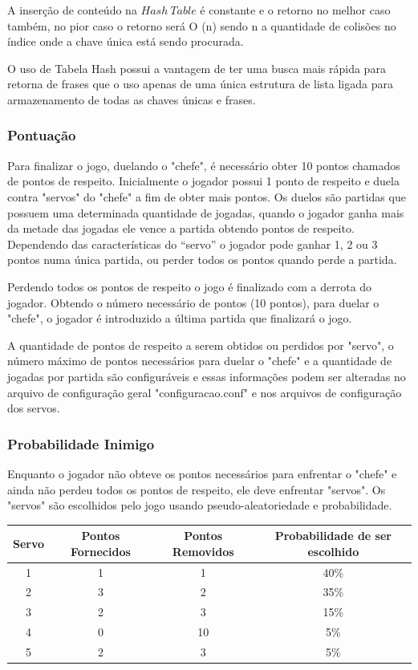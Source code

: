 \documentclass[12pt]{article}
\begin{document}
A inserção de conteúdo na $Hash\ Table$ é constante e o retorno no melhor caso também, no pior caso o retorno será O (n) sendo n a quantidade de colisões no índice onde a chave única está sendo procurada.   
 
O uso de Tabela Hash possui a vantagem de ter uma busca mais rápida para retorna de frases que o uso apenas de uma única estrutura de lista ligada para armazenamento de todas as chaves únicas e frases.



\subsubsection{Pontuação}

Para finalizar o jogo, duelando o "chefe", é necessário obter 10 pontos chamados de pontos de respeito. Inicialmente o jogador possui 1 ponto de respeito e duela contra "servos" do "chefe" a fim de obter mais pontos. Os duelos são partidas que possuem uma determinada quantidade de jogadas, quando o jogador ganha mais da metade das jogadas ele vence a partida obtendo pontos de respeito. Dependendo das características do “servo” o jogador pode ganhar 1, 2 ou 3 pontos numa única partida, ou perder todos os pontos quando perde a partida.

Perdendo todos os pontos de respeito o jogo é finalizado com a derrota do jogador. Obtendo o número necessário de pontos (10 pontos), para duelar o "chefe", o jogador é introduzido a última partida que finalizará o jogo.

A quantidade de pontos de respeito a serem obtidos ou perdidos por "servo", o número máximo de pontos necessários para duelar o "chefe" e a quantidade de jogadas por partida são configuráveis e essas informações podem ser alteradas no arquivo de configuração geral "configuracao.conf" e nos arquivos de configuração dos servos.

\subsubsection{Probabilidade Inimigo}

Enquanto o jogador não obteve os pontos necessários para enfrentar o "chefe" e ainda não perdeu todos os pontos de respeito, ele deve enfrentar "servos". Os "servos" são escolhidos pelo jogo usando pseudo-aleatoriedade e probabilidade.\\


\begin{tabular}{c|c|c|c}
\hline
Servo & Pontos Fornecidos & Pontos Removidos & Probabilidade de ser escolhido \\
\hline
1 & 1 & 1 & 40\%\\
2 & 3 & 2 & 35\%\\
3 & 2 & 3 & 15\%\\
4 & 0 & 10 & 5\%\\
5 & 2 & 3 & 5\%\\
\hline
\end{tabular}
\end{document}
